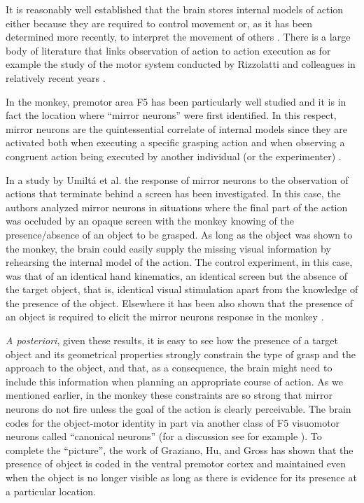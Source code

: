 It is reasonably well established that the brain stores internal models of action
either because they are required to control movement or, as it has been determined
more recently, to interpret the movement of others \cite{kawato-99, wolpert-03, 
mussaivaldi-00, lackner-98}. 
There is a large body of literature that links observation of action to action 
execution as for example the study of the motor system conducted by Rizzolatti and 
colleagues in relatively recent years \cite{rizzolatti-04,gallese-96,rizzolatti-01}. 

In the monkey, premotor area F5 has been particularly well studied and it is in fact the 
location where ``mirror neurons'' were first identified. In this respect, mirror neurons 
are the quintessential correlate of internal models since they are activated 
both when executing a specific grasping action and when observing a congruent action 
being executed by another individual (or the experimenter) \cite{fadiga-00}.

In a study by Umilt\'a et al. \cite{umilta-01} the response of mirror neurons to the observation of
actions that terminate behind a screen has been investigated. In this case, the authors analyzed 
mirror neurons in situations where the final part of the action was occluded by an opaque 
screen with the monkey knowing of the presence/absence of an object to be grasped. As long
as the object was shown to the monkey, the brain could easily supply the missing
visual information by rehearsing the internal model of the action. The control experiment, 
in this case, was that of an identical hand kinematics, an identical screen but the absence of 
the target object, that is, identical visual stimulation apart from the knowledge of the 
presence of the object. Elsewhere it has been also shown that the presence of an object is 
required to elicit the mirror neurons response in the monkey \cite{gallese-96}.

{\em A posteriori}, given these results, it is easy to see how the presence of a target 
object and its geometrical properties strongly constrain the type of grasp and the approach 
to the object, and that, as a consequence, the brain might need to include this information when 
planning an appropriate course of action. 
As we mentioned earlier, in the monkey these constraints are so strong that mirror neurons do not 
fire unless the goal of the action is clearly perceivable. The brain codes for the object-motor 
identity in part via another class of F5 visuomotor neurons called ``canonical neurons'' (for a 
discussion see for example \cite{metta-06}). 
To complete the ``picture'', the work of Graziano, Hu, and Gross \cite{graziano-97} has shown that 
the presence of object is coded in the ventral premotor cortex and maintained even when the 
object is no longer visible as long as there is evidence for its presence at a particular
location.

